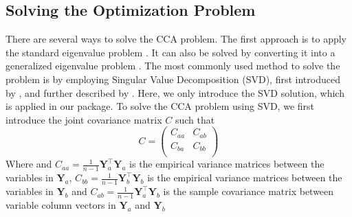 \subsection{Solving the Optimization Problem}
There are several ways to solve the CCA problem. The first approach is to apply the standard eigenvalue problem \citep{HOTELLING1936cca2,hooper1959ccaeigen}. It can also be solved by converting it into a generalized eigenvalue problem \citep{bach2002kernel,hardoon2004canonical}. The most commonly used method to solve the problem is by employing Singular Value Decomposition (SVD), first introduced by \citep{healy1957ccasvd}, and further described by \citep{ewerbring1989canonical}. Here, we only introduce the SVD solution, which is applied in our package.
To solve the CCA problem using SVD, we first introduce the joint covariance matrix $C$ such that
\begin{equation}
	C = \begin{pmatrix}
		C_{aa} & C_{ab}\\
		C_{ba} & C_{bb}\\
	\end{pmatrix}
\end{equation}
Where  and $C_{aa} = \frac{1}{n-1} \mathbf{Y}_a^\top \mathbf{Y}_a$ is the empirical variance matrices between the variables in $\mathbf{Y}_a$, $C_{bb} = \frac{1}{n-1} \mathbf{Y}_b^\top \mathbf{Y}_b$ is the empirical variance matrices between the variables in $\mathbf{Y}_b$ and $C_{ab} = \frac{1}{n-1} \mathbf{Y}_a^\top \mathbf{Y}_b$ is the sample covariance matrix between variable column vectors in $\mathbf{Y}_a$ and $\mathbf{Y}_b$

